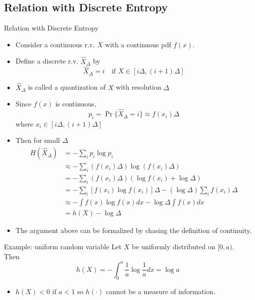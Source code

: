 \documentclass[../main.tex]{subfiles}
\begin{document}
\subsection{Relation with Discrete Entropy}
\begin{pbox}{Relation with Discrete Entropy}
\begin{itemize}
    \item Consider a continuous r.v. $X$ with a continuous pdf $f(x)$.
    \item Define a discrete r.v. $\hat X_{\Delta}$ by \[
    \hat X_{\Delta} = i \quad \text{if $X\in[i\Delta, (i+1)\Delta]$}
    \]
    \item $\hat X_{\Delta}$ is called a quantization of $X$ with resolution $\Delta$
    \item Since $f(x)$ is continuous, \[
    p_i = \Pr\{\hat X_\Delta = i\} \approx f(x_i)\Delta
    \] where $x_i \in [i\Delta, (i+1)\Delta]$
    \item Then for small $\Delta$ \begin{align*}
    H(\hat X_\Delta) &= -\sum_{i}p_i \log p_i\\
    &\approx -\sum_{i}(f(x_i)\Delta)\log (f(x_i)\Delta)\\
    &= -\sum_{i} (f(x_i)\Delta)(\log f(x_i)+\log \Delta)\\
    &= -\sum_{i}[f(x_i)\log f(x_i)]\Delta - (\log \Delta)\sum_{i}f(x_i)\Delta\\
    &\approx -\int f(x)\log f(x)dx - \log \Delta \int f(x)dx\\
    &= h(X)-\log \Delta
    \end{align*}
    \item The argument above can be formalized by chasing the definition of continuity.
\end{itemize}
\end{pbox}
\begin{pbox}{Example: uniform random variable}
Let $X$ be uniformly distributed on $[0,a)$. Then \[
h(X) = -\int_0^a \frac{1}{a}\log \frac{1}{a} dx = \log a
\]
\begin{remark}
    \begin{itemize}
        \item $h(X)<0$ if $a<1$ so $h(\cdot)$ cannot be a measure of information.
    \end{itemize}
\end{remark}
\end{pbox}
\end{document}
